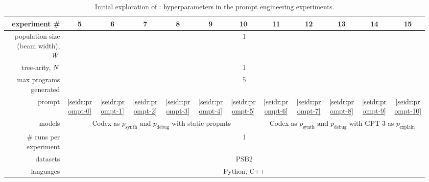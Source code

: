 \begin{table}[t]
\setlength{\tabcolsep}{5pt}
\centering
\caption{Initial exploration of \method{}: hyperparameters in the prompt engineering experiments.}\small
\label{tab:seidr:prompt-engineering-hyperparameters}%
\begin{DIFnomarkup} %
\begin{tabular}{rccccccccccc}
\toprule
experiment \# & 5 & 6 & 7 & 8 & 9 & 10 & 11 & 12 & 13 & 14 & 15 \\
\midrule
population size (beam width), $W{}$ & \multicolumn{11}{c}{1} \\[1pt]
tree-arity, $N{}$ & \multicolumn{11}{c}{1} \\[1pt]
\midrule
max programs generated & \multicolumn{11}{c}{5} \\[1pt]
prompt & 
\ref{seidr:prompt-0} &
\ref{seidr:prompt-1} &
\ref{seidr:prompt-2} &
\ref{seidr:prompt-3} &
\ref{seidr:prompt-4} &
\ref{seidr:prompt-5} &
\ref{seidr:prompt-6} &
\ref{seidr:prompt-7} &
\ref{seidr:prompt-8} &
\ref{seidr:prompt-9} &
\ref{seidr:prompt-10} \\[1pt]
models  & \multicolumn{6}{c}{\parbox{3.8cm}{\centering Codex as $p_\text{synth} \text{ and } p_\text{debug}$ with  static propmts}} & 
\multicolumn{5}{c}{\parbox{3.6cm}{\centering Codex as $p_\text{synth} \text{ and } p_\text{debug}$ with  GPT-3 as $p_\text{explain}$}}\\[6pt]
\midrule
\# runs per experiment  &  
\multicolumn{11}{c}{1} \\[1pt]
datasets  & \multicolumn{11}{c}{PSB2} \\[1pt]
languages  & \multicolumn{11}{c}{Python, C++} \\
\bottomrule
\end{tabular}
\end{DIFnomarkup} %
\end{table}


